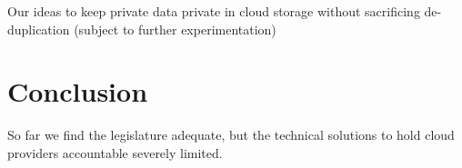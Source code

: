 \documentclass[11pt]{article}
\begin{document}
Our ideas to keep private data private in cloud storage without sacrificing de-duplication
(subject to further experimentation)


\section{Conclusion}
So far we find the legislature adequate, but the technical solutions to hold cloud providers accountable severely limited.


{}

\end{document}
